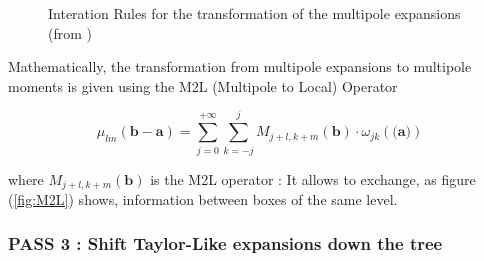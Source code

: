 \documentclass[10pt,twoside,a4paper]{report}
\begin{document}
	 
 \begin{figure}[H]
    \centering 
    \caption{Interation Rules for the transformation of the multipole expansions (from \cite{phdIvo})}
    \label{fig:multipole}
   \end{figure}   
   
	  Mathematically, the transformation from multipole expansions to multipole moments is given using the  M2L (Multipole to Local) Operator
	  
	  \begin{equation}
	  \mu_{lm}(\textbf{b} - \textbf{a}) = \sum\limits_{j = 0}^{+\infty} \sum\limits_{k=-j}^{j}
	  M_{j+l,k+m}(\textbf{b}) \cdot \omega_{jk}(\textbf{(a)})
	  \end{equation}
   
   	where $M_{j+l,k+m}(\textbf{b})$ is the M2L operator : It allows to exchange, as figure (\ref{fig:M2L}) shows, information between boxes of the same level.

\subsubsection{PASS 3 : Shift Taylor-Like expansions down the tree}
\end{document}
